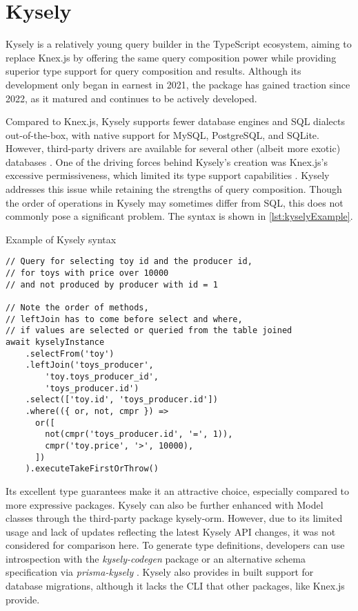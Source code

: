 \section{Kysely}
Kysely is a relatively young query builder in the TypeScript ecosystem, aiming
to replace Knex.js by offering the same query composition power while providing
superior type support for query composition and results. Although its
development only began in earnest in 2021, the package has gained traction since
2022, as it matured and continues to be actively developed.

Compared to Knex.js, Kysely supports fewer database engines and SQL dialects
out-of-the-box, with native support for MySQL, PostgreSQL, and SQLite. However,
third-party drivers are available for several other (albeit more exotic)
databases \cite{kyselyWeb}. One of the driving forces behind Kysely's creation
was Knex.js's excessive permissiveness, which limited its type support
capabilities \cite{kyselyGithub}. Kysely addresses this issue while retaining
the strengths of query composition. Though the order of operations in Kysely may
sometimes differ from SQL, this does not commonly pose a significant problem.
The syntax is shown in \autoref{lst:kyselyExample}.

\begin{listing}[ht]
    \caption{Example of Kysely syntax}
    \label{lst:kyselyExample}
    \begin{verbatim}
// Query for selecting toy id and the producer id, 
// for toys with price over 10000 
// and not produced by producer with id = 1

// Note the order of methods, 
// leftJoin has to come before select and where, 
// if values are selected or queried from the table joined
await kyselyInstance
    .selectFrom('toy')
    .leftJoin('toys_producer', 
        'toy.toys_producer_id', 
        'toys_producer.id')
    .select(['toy.id', 'toys_producer.id'])
    .where(({ or, not, cmpr }) =>
      or([
        not(cmpr('toys_producer.id', '=', 1)),
        cmpr('toy.price', '>', 10000),
      ])
    ).executeTakeFirstOrThrow()
\end{verbatim}
\end{listing}

Its excellent type guarantees make it an attractive choice, especially compared
to more expressive packages. Kysely can also be further enhanced with Model
classes through the third-party package kysely-orm. However, due to its limited
usage and lack of updates reflecting the latest Kysely API changes, it was not
considered for comparison here. To generate type definitions, developers can use
introspection with the \textit{kysely-codegen} package \cite{kyselyCodegen} or
an alternative schema specification via \textit{prisma-kysely}
\cite{kyselyPrisma}. Kysely also provides in built support for database
migrations, although it lacks the CLI that other packages, like Knex.js
provide.

